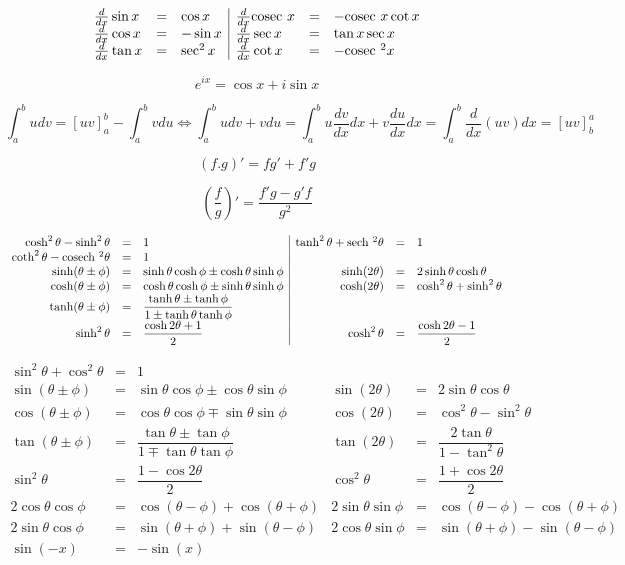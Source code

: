 \documentclass[11pt,a4paper]{article}
\begin{document}
\[\begin{array}{lcl|lcl}
\frac{d}{dx}\sin x&=&\cos x&
\frac{d}{dx}\mathrm{cosec}\  x&=&-\mathrm{cosec}\  x\cot x\\
\frac{d}{dx}\cos x&=&-\sin x&
\frac{d}{dx}\sec x&=&\tan x\sec x\\
\frac{d}{dx}\tan x&=&\sec^2x&
\frac{d}{dx}\cot x&=&-\mathrm{cosec}\ ^2x
\end{array}\]

$$e^{ix}=\cos x+i\sin x$$

$$\int_a^budv=[uv]_a^b-\int_a^bvdu\Longleftrightarrow\int_a^budv+vdu=\int_a^bu\frac{dv}{dx}dx+v\frac{du}{dx}dx=\int_a^b\frac{d}{dx}(uv)dx=[uv]_b^a$$

$$(f.g)'=fg'+f'g$$

$$\left(\frac{f}{g}\right)'=\frac{f'g-g'f}{g^2}$$

\[\begin{array}{rcl|rcl}
\cosh^2\theta-\sinh^2\theta&=&1&
\tanh^2\theta+\mathrm{sech}\ ^2\theta&=&1\\
\coth^2\theta-\mathrm{cosech}\ ^2\theta&=&1\\
\sinh(\theta\pm\phi)&=&\sinh\theta\cosh\phi\pm\cosh\theta\sinh\phi&
\sinh(2\theta)&=&2\sinh\theta\cosh\theta\\
\cosh(\theta\pm\phi)&=&\cosh\theta\cosh\phi\pm\sinh\theta\sinh\phi&
\cosh(2\theta)&=&\cosh^2\theta+\sinh^2\theta\\
\tanh(\theta\pm\phi)&=&\dfrac{\tanh\theta\pm\tanh\phi}{1\pm\tanh\theta\tanh\phi}&\\
\sinh^2\theta&=&\dfrac{\cosh2\theta+1}{2}&
\cosh^2\theta&=&\dfrac{\cosh2\theta-1}{2}
\end{array}\]

\[\begin{array}{rcl|rcl}
\sin^2\theta+\cos^2\theta&=&1\\
\sin(\theta\pm\phi)&=&\sin\theta\cos\phi\pm\cos\theta\sin\phi&
\sin(2\theta)&=&2\sin\theta\cos\theta\\
\cos(\theta\pm\phi)&=&\cos\theta\cos\phi\mp\sin\theta\sin\phi&
\cos(2\theta)&=&\cos^2\theta-\sin^2\theta\\
\tan(\theta\pm\phi)&=&\dfrac{\tan\theta\pm\tan\phi}{1\mp\tan\theta\tan\phi}&
\tan(2\theta)&=&\dfrac{2\tan\theta}{1-\tan^2\theta}\\
\sin^2\theta&=&\dfrac{1-\cos2\theta}{2}&
\cos^2\theta&=&\dfrac{1+\cos2\theta}{2}\\
2\cos\theta\cos\phi&=&\cos(\theta-\phi)+\cos(\theta+\phi)&
2\sin\theta\sin\phi&=&\cos(\theta-\phi)-\cos(\theta+\phi)\\
2\sin\theta\cos\phi&=&\sin(\theta+\phi)+\sin(\theta-\phi)&
2\cos\theta\sin\phi&=&\sin(\theta+\phi)-\sin(\theta-\phi)\\
\sin(-x)&=&-\sin(x)&
\end{array}\]
\end{document}
